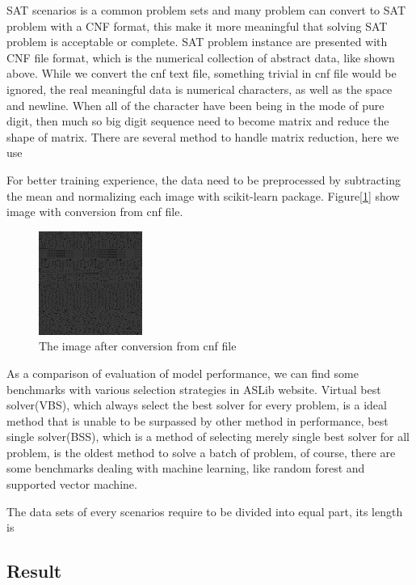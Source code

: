 \documentclass{article}
\begin{document}
    SAT scenarios is a common problem sets and many problem can convert to SAT problem with a CNF format, this make it more meaningful that solving SAT problem is acceptable or complete. SAT problem instance are presented with CNF file format, which is the numerical collection of abstract data, like shown above. While we convert the cnf text file, something trivial in cnf file would be ignored, the real meaningful data is numerical characters, as well as the space and newline.  When all of the character have been being in the mode of pure digit, then much so big digit sequence need to become matrix and reduce the shape of matrix. There are several method to handle matrix reduction, here we use %

    For better training experience, the data need to be preprocessed by subtracting the mean and normalizing each image with scikit-learn package. Figure[\ref{fig:CNF-image}] show image with conversion from cnf file.

    \begin{figure}[htbp!]
        \centering
        \includegraphics[scale=0.7]{./assets/cnf-image.png}
        \caption{The image after conversion from cnf file}
        \label{fig:CNF-image}
    \end{figure}

    As a comparison of evaluation of model performance, we can find some benchmarks with various selection strategies in ASLib website. Virtual best solver(VBS), which always select the best solver for every problem, is a ideal method that is unable to be surpassed by other method in performance, best single solver(BSS), which is a method of selecting merely single best solver for all problem, is the oldest method to solve a batch of problem, of course, there are some benchmarks dealing with machine learning, like random forest and supported vector machine.

    The data sets of every scenarios require to be divided into equal part, its length is 

\subsection{Result}
\end{document}
